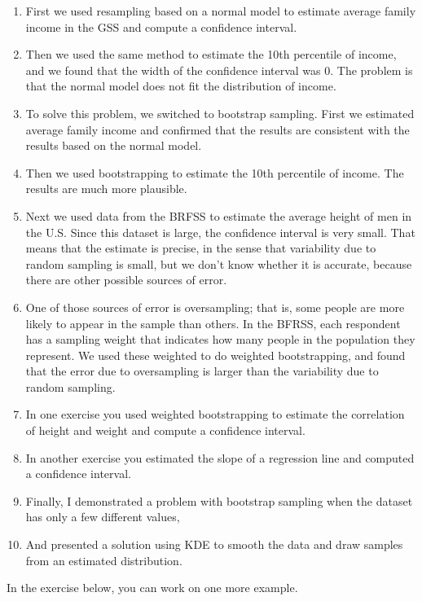 \begin{enumerate}
\def\labelenumi{\arabic{enumi}.}
\item
  First we used resampling based on a normal model to estimate average
  family income in the GSS and compute a confidence interval.
\item
  Then we used the same method to estimate the 10th percentile of
  income, and we found that the width of the confidence interval was 0.
  The problem is that the normal model does not fit the distribution of
  income.
\item
  To solve this problem, we switched to bootstrap sampling. First we
  estimated average family income and confirmed that the results are
  consistent with the results based on the normal model.
\item
  Then we used bootstrapping to estimate the 10th percentile of income.
  The results are much more plausible.
\item
  Next we used data from the BRFSS to estimate the average height of men
  in the U.S. Since this dataset is large, the confidence interval is
  very small. That means that the estimate is precise, in the sense that
  variability due to random sampling is small, but we don't know whether
  it is accurate, because there are other possible sources of error.
\item
  One of those sources of error is oversampling; that is, some people
  are more likely to appear in the sample than others. In the BFRSS,
  each respondent has a sampling weight that indicates how many people
  in the population they represent. We used these weighted to do
  weighted bootstrapping, and found that the error due to oversampling
  is larger than the variability due to random sampling.
\item
  In one exercise you used weighted bootstrapping to estimate the
  correlation of height and weight and compute a confidence interval.
\item
  In another exercise you estimated the slope of a regression line and
  computed a confidence interval.
\item
  Finally, I demonstrated a problem with bootstrap sampling when the
  dataset has only a few different values,
\item
  And presented a solution using KDE to smooth the data and draw samples
  from an estimated distribution.
\end{enumerate}

In the exercise below, you can work on one more example.

